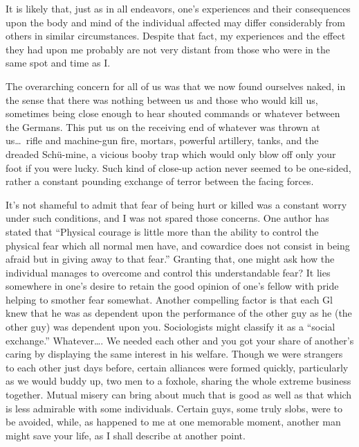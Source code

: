 \documentclass[../m3y]{subfiles}
\begin{document}
It is likely that, just as in all endeavors, one's experiences and their consequences upon the body and mind of the individual affected may differ considerably from others in similar circumstances. Despite that fact, my experiences and the effect they had upon me probably are not very distant from those who were in the same spot and time as I.

The overarching concern for all of us was that we now found ourselves naked, in the sense that there was nothing between us and those who would kill us, sometimes being close enough to hear shouted commands or whatever between the Germans. This put us on the receiving end of whatever was thrown at us\ldots\ rifle and machine-gun fire, mortars, powerful artillery, tanks, and the dreaded Sch{\"u}-mine, a vicious booby trap which would only blow off only your foot if you were lucky. Such kind of close-up action never seemed to be one-sided, rather a constant pounding exchange of terror between the facing forces.

It's not shameful to admit that fear of being hurt or killed was a constant worry under such conditions, and I was not spared those concerns. One author has stated that ``Physical courage is little more than the ability to control the physical fear which all normal men have, and cowardice does not consist in being afraid but in giving away to that fear.'' Granting that, one might ask how the individual manages to overcome and control this understandable fear? It lies somewhere in one's desire to retain the good opinion of one's fellow with pride helping to smother fear somewhat. Another compelling factor is that each Gl knew that he was as dependent upon the performance of the other guy as he (the other guy) was dependent upon you. Sociologists might classify it as a ``social exchange.'' Whatever\ldots\@. We needed each other and you got your share of another's caring by displaying the same interest in his welfare. Though we were strangers to each other just days before, certain alliances were formed quickly, particularly as we would buddy up, two men to a foxhole, sharing the whole extreme business together. Mutual misery can bring about much that is good as well as that which is less admirable with some individuals. Certain guys, some truly slobs, were to be avoided, while, as happened to me at one memorable moment, another man might save your life, as I shall describe at another point.
\end{document}
